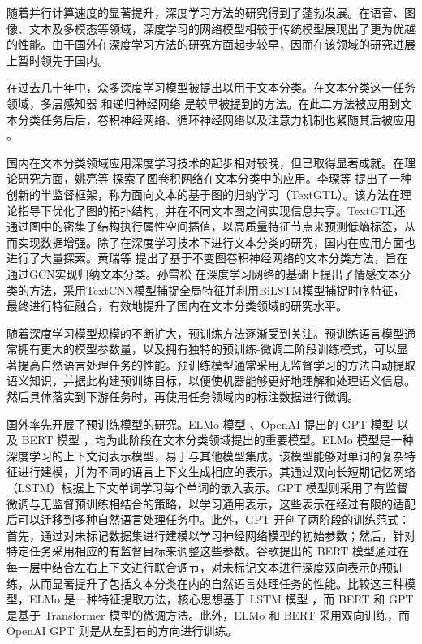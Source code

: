 随着并行计算速度的显著提升，深度学习方法的研究得到了蓬勃发展。在语音、图像、文本及多模态等领域，深度学习的网络模型相较于传统模型展现出了更为优越的性能。由于国外在深度学习方法的研究方面起步较早，因而在该领域的研究进展上暂时领先于国内。

在过去几十年中，众多深度学习模型被提出以用于文本分类。在文本分类这一任务领域，多层感知器 \cite{Alsmadi2009PerformanceCO} 和递归神经网络 \cite{10.1145/3234150} 是较早被提到的方法。在此二方法被应用到文本分类任务后后，卷积神经网络、循环神经网络以及注意力机制也紧随其后被应用 \cite{Zhao2018InvestigatingCN, Qin2020DCRNetAD, Deng2021HTCInfoMaxAG}。

国内在文本分类领域应用深度学习技术的起步相对较晚，但已取得显著成就。在理论研究方面，姚亮等 \cite{Yao2018GraphCN} 探索了图卷积网络在文本分类中的应用。李琛等 \cite{Li2021TextGTLGT} 提出了一种创新的半监督框架，称为面向文本的基于图的归纳学习（TextGTL）。该方法在理论指导下优化了图的拓扑结构，并在不同文本图之间实现信息共享。TextGTL还通过图中的密集子结构执行属性空间插值，以高质量特征节点来预测低熵标签，从而实现数据增强。除了在深度学习技术下进行文本分类的研究，国内在应用方面也进行了大量探索。黄瑞等 \cite{JSJA2024S1014} 提出了基于不变图卷积神经网络的文本分类方法，旨在通过GCN实现归纳文本分类。孙雪松 \cite{1024533250.nh} 在深度学习网络的基础上提出了情感文本分类的方法，采用TextCNN模型捕捉全局特征并利用BiLSTM模型捕捉时序特征，最终进行特征融合，有效地提升了国内在文本分类领域的研究水平。


随着深度学习模型规模的不断扩大，预训练方法逐渐受到关注。预训练语言模型通常拥有更大的模型参数量，以及拥有独特的预训练-微调二阶段训练模式，可以显著提高自然语言处理任务的性能。预训练模型通常采用无监督学习的方法自动提取语义知识，并据此构建预训练目标，以便使机器能够更好地理解和处理语义信息。然后具体落实到下游任务时，再使用任务领域内的标注数据进行微调。

国外率先开展了预训练模型的研究。ELMo 模型 \cite{Peters2018DeepCW}、OpenAI 提出的 GPT 模型 \cite{gpt} 以及 BERT 模型 \cite{devlin_bert_2019}，均为此阶段在文本分类领域提出的重要模型。ELMo 模型是一种深度学习的上下文词表示模型，易于与其他模型集成。该模型能够对单词的复杂特征进行建模，并为不同的语言上下文生成相应的表示。其通过双向长短期记忆网络（LSTM）根据上下文单词学习每个单词的嵌入表示。GPT 模型则采用了有监督微调与无监督预训练相结合的策略，以学习通用表示，这些表示在经过有限的适配后可以迁移到多种自然语言处理任务中。此外，GPT 开创了两阶段的训练范式：首先，通过对未标记数据集进行建模以学习神经网络模型的初始参数；然后，针对特定任务采用相应的有监督目标来调整这些参数。谷歌提出的 BERT 模型通过在每一层中结合左右上下文进行联合调节，对未标记文本进行深度双向表示的预训练，从而显著提升了包括文本分类在内的自然语言处理任务的性能。比较这三种模型，ELMo 是一种特征提取方法，核心思想基于 LSTM 模型 \cite{LSTM}，而 BERT 和 GPT 是基于 Transformer 模型的微调方法。此外，ELMo 和 BERT 采用双向训练，而 OpenAI GPT 则是从左到右的方向进行训练。

